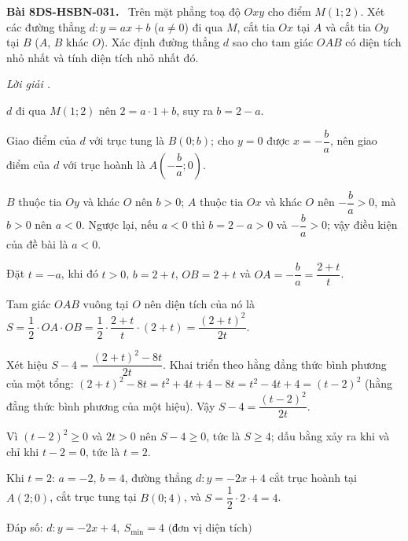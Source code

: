 \documentclass[12pt,a4paper]{article}
\newenvironment{problem}[1][]{\par\medskip\noindent\textbf{Bài #1.}\ }{\par}
\newenvironment{solution}[1][]{\par\noindent\textit{Lời giải #1.}\par}{\par}
\begin{document}
\begin{problem}[8DS-HSBN-031]
Trên mặt phẳng toạ độ $Oxy$ cho điểm $M(1; 2)$. Xét các đường thẳng $d\colon y = ax + b$ ($a \neq 0$) đi qua $M$, cắt tia $Ox$ tại $A$ và cắt tia $Oy$ tại $B$ ($A$, $B$ khác $O$). Xác định đường thẳng $d$ sao cho tam giác $OAB$ có diện tích nhỏ nhất và tính diện tích nhỏ nhất đó.

\begin{solution}
$d$ đi qua $M(1; 2)$ nên $2 = a \cdot 1 + b$, suy ra $b = 2 - a$.

Giao điểm của $d$ với trục tung là $B(0; b)$; cho $y = 0$ được $x = -\dfrac{b}{a}$, nên giao điểm của $d$ với trục hoành là $A\left(-\dfrac{b}{a}; 0\right)$.

$B$ thuộc tia $Oy$ và khác $O$ nên $b > 0$; $A$ thuộc tia $Ox$ và khác $O$ nên $-\dfrac{b}{a} > 0$, mà $b > 0$ nên $a < 0$. Ngược lại, nếu $a < 0$ thì $b = 2 - a > 0$ và $-\dfrac{b}{a} > 0$; vậy điều kiện của đề bài là $a < 0$.

Đặt $t = -a$, khi đó $t > 0$, $b = 2 + t$, $OB = 2 + t$ và $OA = -\dfrac{b}{a} = \dfrac{2 + t}{t}$.

Tam giác $OAB$ vuông tại $O$ nên diện tích của nó là $S = \dfrac{1}{2} \cdot OA \cdot OB = \dfrac{1}{2} \cdot \dfrac{2 + t}{t} \cdot (2 + t) = \dfrac{(2 + t)^2}{2t}$.

Xét hiệu $S - 4 = \dfrac{(2 + t)^2 - 8t}{2t}$. Khai triển theo hằng đẳng thức bình phương của một tổng: $(2 + t)^2 - 8t = t^2 + 4t + 4 - 8t = t^2 - 4t + 4 = (t - 2)^2$ (hằng đẳng thức bình phương của một hiệu). Vậy $S - 4 = \dfrac{(t - 2)^2}{2t}$.

Vì $(t - 2)^2 \geq 0$ và $2t > 0$ nên $S - 4 \geq 0$, tức là $S \geq 4$; dấu bằng xảy ra khi và chỉ khi $t - 2 = 0$, tức là $t = 2$.

Khi $t = 2$: $a = -2$, $b = 4$, đường thẳng $d\colon y = -2x + 4$ cắt trục hoành tại $A(2; 0)$, cắt trục tung tại $B(0; 4)$, và $S = \dfrac{1}{2} \cdot 2 \cdot 4 = 4$.

Đáp số: $\boxed{d\colon y = -2x + 4,\ S_{\min} = 4 \text{ (đơn vị diện tích)}}$
\end{solution}
\end{problem}
\end{document}
